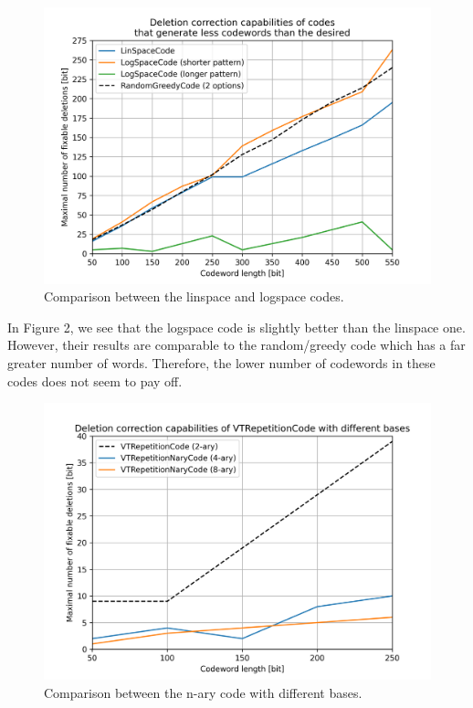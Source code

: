 \documentclass{article}
\begin{document}
\begin{figure}[H]
    \centering
    \includegraphics[width=1\textwidth]{artifacts/figure2.png}
    \caption{Comparison between the linspace and logspace codes.}
\end{figure}

\noindent In Figure 2, we see that the logspace code is slightly better than the linspace one. However, their results are comparable to the random/greedy code which has a far greater number of words. Therefore, the lower number of codewords in these codes does not seem to pay off.

\begin{figure}[H]
    \centering
    \includegraphics[width=1\textwidth]{artifacts/figure3.png}
    \caption{Comparison between the n-ary code with different bases.}
\end{figure}
\end{document}
